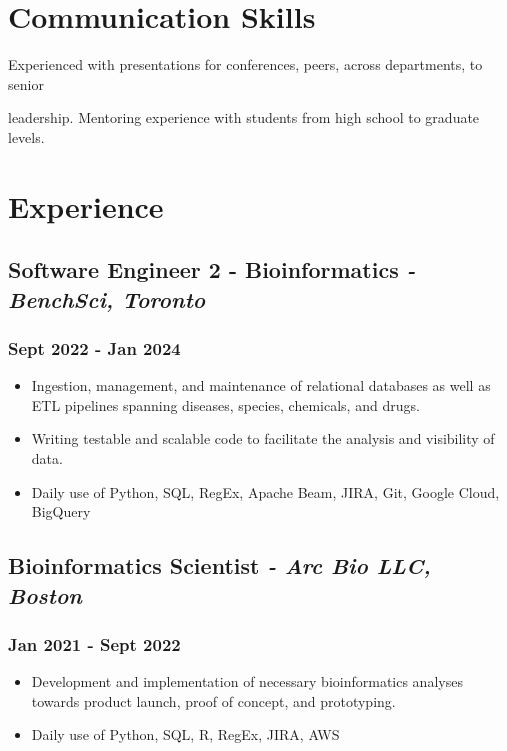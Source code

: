 \documentclass[11pt]{article}
\begin{document}
\section{Communication Skills}
\begin{description}
    \item Experienced with presentations for conferences, peers, across departments, to senior 
    \item leadership. Mentoring experience with students from high school to graduate levels.
\end{description}



\section{Experience}
\bigskip
\subsection{Software Engineer 2 - Bioinformatics \normalfont\textit{- BenchSci, Toronto}}
\subsubsection{Sept 2022 - Jan 2024}
\begin{itemize}
    \item Ingestion, management, and maintenance of relational databases as well as ETL pipelines spanning diseases, species, chemicals, and drugs.
    \item Writing testable and scalable code to facilitate the analysis and visibility of data.
    \item Daily use of Python, SQL, RegEx, Apache Beam, JIRA, Git, Google Cloud, BigQuery
\end{itemize}
\bigskip


\subsection{Bioinformatics Scientist \normalfont\textit{- Arc Bio LLC, Boston}}
\subsubsection{Jan 2021 - Sept 2022}
\begin{itemize}
    \item Development and implementation of necessary bioinformatics analyses towards product launch, proof of
concept, and prototyping.
    \item Daily use of Python, SQL, R, RegEx, JIRA, AWS
\end{itemize}
\bigskip
\end{document}
